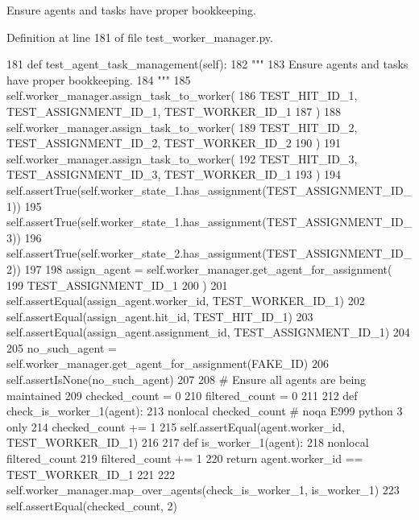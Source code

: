 \begin{DoxyVerb}Ensure agents and tasks have proper bookkeeping.
\end{DoxyVerb}
 

Definition at line 181 of file test\+\_\+worker\+\_\+manager.\+py.


\begin{DoxyCode}
181     \textcolor{keyword}{def }test\_agent\_task\_management(self):
182         \textcolor{stringliteral}{"""}
183 \textcolor{stringliteral}{        Ensure agents and tasks have proper bookkeeping.}
184 \textcolor{stringliteral}{        """}
185         self.worker\_manager.assign\_task\_to\_worker(
186             TEST\_HIT\_ID\_1, TEST\_ASSIGNMENT\_ID\_1, TEST\_WORKER\_ID\_1
187         )
188         self.worker\_manager.assign\_task\_to\_worker(
189             TEST\_HIT\_ID\_2, TEST\_ASSIGNMENT\_ID\_2, TEST\_WORKER\_ID\_2
190         )
191         self.worker\_manager.assign\_task\_to\_worker(
192             TEST\_HIT\_ID\_3, TEST\_ASSIGNMENT\_ID\_3, TEST\_WORKER\_ID\_1
193         )
194         self.assertTrue(self.worker\_state\_1.has\_assignment(TEST\_ASSIGNMENT\_ID\_1))
195         self.assertTrue(self.worker\_state\_1.has\_assignment(TEST\_ASSIGNMENT\_ID\_3))
196         self.assertTrue(self.worker\_state\_2.has\_assignment(TEST\_ASSIGNMENT\_ID\_2))
197 
198         assign\_agent = self.worker\_manager.get\_agent\_for\_assignment(
199             TEST\_ASSIGNMENT\_ID\_1
200         )
201         self.assertEqual(assign\_agent.worker\_id, TEST\_WORKER\_ID\_1)
202         self.assertEqual(assign\_agent.hit\_id, TEST\_HIT\_ID\_1)
203         self.assertEqual(assign\_agent.assignment\_id, TEST\_ASSIGNMENT\_ID\_1)
204 
205         no\_such\_agent = self.worker\_manager.get\_agent\_for\_assignment(FAKE\_ID)
206         self.assertIsNone(no\_such\_agent)
207 
208         \textcolor{comment}{# Ensure all agents are being maintained}
209         checked\_count = 0
210         filtered\_count = 0
211 
212         \textcolor{keyword}{def }check\_is\_worker\_1(agent):
213             nonlocal checked\_count  \textcolor{comment}{# noqa E999 python 3 only}
214             checked\_count += 1
215             self.assertEqual(agent.worker\_id, TEST\_WORKER\_ID\_1)
216 
217         \textcolor{keyword}{def }is\_worker\_1(agent):
218             nonlocal filtered\_count
219             filtered\_count += 1
220             \textcolor{keywordflow}{return} agent.worker\_id == TEST\_WORKER\_ID\_1
221 
222         self.worker\_manager.map\_over\_agents(check\_is\_worker\_1, is\_worker\_1)
223         self.assertEqual(checked\_count, 2)

\end{DoxyCode}
